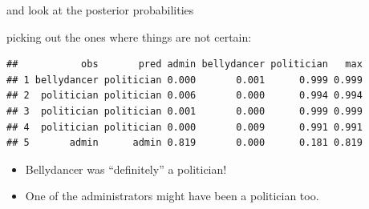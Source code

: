 \documentclass[ignorenonframetext,]{beamer}
\newenvironment{Shaded}{\begin{snugshade}}{\end{snugshade}}
\newcommand{\DataTypeTok}[1]{\textcolor[rgb]{0.13,0.29,0.53}{#1}}
\newcommand{\DecValTok}[1]{\textcolor[rgb]{0.00,0.00,0.81}{#1}}
\newcommand{\FloatTok}[1]{\textcolor[rgb]{0.00,0.00,0.81}{#1}}
\newcommand{\KeywordTok}[1]{\textcolor[rgb]{0.13,0.29,0.53}{\textbf{#1}}}
\newcommand{\NormalTok}[1]{#1}
\newcommand{\OperatorTok}[1]{\textcolor[rgb]{0.81,0.36,0.00}{\textbf{#1}}}
\newcommand{\StringTok}[1]{\textcolor[rgb]{0.31,0.60,0.02}{#1}}
\begin{document}
\begin{frame}[fragile]{and look at the posterior probabilities}
\protect\hypertarget{and-look-at-the-posterior-probabilities}{}

picking out the ones where things are not certain:

\footnotesize

\begin{Shaded}
\end{Shaded}

\begin{verbatim}
##           obs       pred admin bellydancer politician   max
## 1 bellydancer politician 0.000       0.001      0.999 0.999
## 2  politician politician 0.006       0.000      0.994 0.994
## 3  politician politician 0.001       0.000      0.999 0.999
## 4  politician politician 0.000       0.009      0.991 0.991
## 5       admin      admin 0.819       0.000      0.181 0.819
\end{verbatim}

\normalsize

\begin{itemize}
\item
  Bellydancer was ``definitely'' a politician!
\item
  One of the administrators might have been a politician too.
\end{itemize}

\end{frame}
\end{document}
